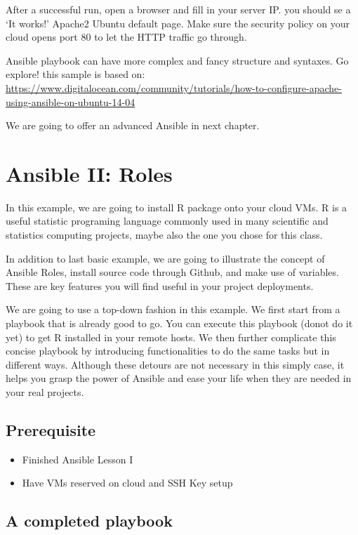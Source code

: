 After a successful run, open a browser and fill in your server IP. you
should se a `It works!' Apache2 Ubuntu default page. Make sure the
security policy on your cloud opens port 80 to let the HTTP traffic go
through.

Ansible playbook can have more complex and fancy structure and syntaxes.
Go explore! this sample is based on:
\url{https://www.digitalocean.com/community/tutorials/how-to-configure-apache-using-ansible-on-ubuntu-14-04}

We are going to offer an advanced Ansible in next chapter.
\section{Ansible II: Roles}\label{ansible-ii-roles}

In this example, we are going to install R package onto your cloud VMs.
R is a useful statistic programing language commonly used in many
scientific and statistics computing projects, maybe also the one you
chose for this class.

In addition to last basic example, we are going to illustrate the
concept of Ansible Roles, install source code through Github, and make
use of variables. These are key features you will find useful in your
project deployments.

We are going to use a top-down fashion in this example. We first start
from a playbook that is already good to go. You can execute this
playbook (donot do it yet) to get R installed in your remote hosts. We
then further complicate this concise playbook by introducing
functionalities to do the same tasks but in different ways. Although
these detours are not necessary in this simply case, it helps you grasp
the power of Ansible and ease your life when they are needed in your
real projects.

\subsection{Prerequisite}\label{prerequisite}

\begin{itemize}

\item
  Finished Ansible Lesson I
\item
  Have VMs reserved on cloud and SSH Key setup
\end{itemize}

\subsection{A completed playbook}\label{a-completed-playbook}

